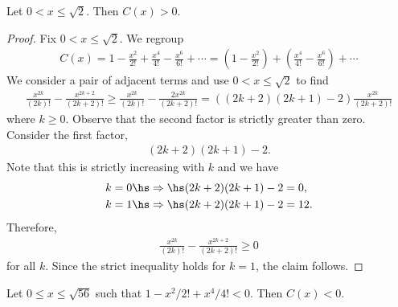 \documentclass{article}
\begin{document}
\begin{claim*}
   Let $0<x\leq \sqrt{2}$. Then $C(x)>0$.
\end{claim*}
\begin{proof}
   Fix $0<x\leq\sqrt{2}$. We regroup
   \begin{align*}
      C(x) = 1 - \frac{x^2}{2!} + \frac{x^4}{4!} - \frac{x^6}{6!} + \cdots
      = \left(1 - \frac{x^2}{2!}\right) + \left(\frac{x^4}{4!} - \frac{x^6}{6!}\right) + \cdots
   \end{align*}
   We consider a pair of adjacent terms and use $0<x\leq\sqrt{2}$ to find
   \begin{align*}
      \frac{x^{2k}}{(2k)!} - \frac{x^{2k+2}}{(2k+2)!}
      \geq \frac{x^{2k}}{(2k)!}-\frac{2x^{2k}}{(2k+2)!}
      = ((2k+2)(2k+1)-2)\frac{x^{2k}}{(2k+2)!}
   \end{align*}
   where $k\geq 0$.
   Observe that the second factor is strictly greater than zero. Consider the first factor,
   \begin{align*}
      (2k+2)(2k+1) - 2.
   \end{align*}
   Note that this is strictly increasing with $k$ and we have
   \begin{align*}
      k=0 \hs & \Rightarrow\hs (2k+2)(2k+1) - 2 = 0,  \\
      k=1 \hs & \Rightarrow\hs (2k+2)(2k+1) - 2 = 12. \\
   \end{align*}
   Therefore,
   \begin{align*}
      \frac{x^{2k}}{(2k)!} - \frac{x^{2k+2}}{(2k+2)!} \geq 0
   \end{align*}
   for all $k$. Since the strict inequality holds for $k=1$, the claim follows.
\end{proof}
\begin{claim*}
   Let $0\leq x\leq \sqrt{56}$ such that $1-x^2/2!+x^4/4!<0$. Then $C(x)<0$.
\end{claim*}
\end{document}

